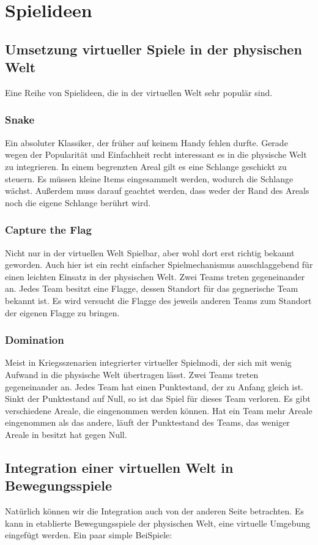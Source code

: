 \documentclass[runningheads,a4paper]{llncs}
\begin{document}
\author{Jonas Lenze}

\section{Spielideen}

\subsection{Umsetzung virtueller Spiele in der physischen Welt}

Eine Reihe von Spielideen, die in der virtuellen Welt sehr populär sind.
\subsubsection{Snake}
Ein absoluter Klassiker, der früher auf keinem Handy fehlen durfte. Gerade wegen der
Popularität und Einfachheit recht interessant es in die physische Welt zu integrieren.
In einem begrenzten Areal gilt es eine Schlange geschickt zu steuern. Es müssen kleine
Items eingesammelt werden, wodurch die Schlange wächst. Außerdem muss darauf
geachtet werden, dass weder der Rand des Areals noch die eigene Schlange berührt wird.
\subsubsection{Capture the Flag}
Nicht nur in der virtuellen Welt Spielbar, aber wohl dort erst richtig bekannt geworden.
Auch hier ist ein recht einfacher Spielmechanismus ausschlaggebend für einen leichten
Einsatz in der physischen Welt.
Zwei Teams treten gegeneinander an. Jedes Team besitzt eine Flagge, dessen Standort für
das gegnerische Team bekannt ist. Es wird versucht die Flagge des jeweils anderen Teams
zum Standort der eigenen Flagge zu bringen.
\subsubsection{Domination}
Meist in Kriegsszenarien integrierter virtueller Spielmodi, der sich mit wenig Aufwand in die
physische Welt übertragen lässt.
Zwei Teams treten gegeneinander an. Jedes Team hat einen Punktestand, der zu Anfang
gleich ist. Sinkt der Punktestand auf Null, so ist das Spiel für dieses Team verloren. Es gibt
verschiedene Areale, die eingenommen werden können. Hat ein Team mehr Areale
eingenommen als das andere, läuft der Punktestand des Teams, das weniger Areale in
besitzt hat gegen Null.

\subsection{Integration einer virtuellen Welt in Bewegungsspiele}
Natürlich können wir die Integration auch von der anderen Seite betrachten. Es kann in
etablierte Bewegungsspiele der physischen Welt, eine virtuelle Umgebung eingefügt
werden.
Ein paar simple BeiSpiele:
\end{document}

